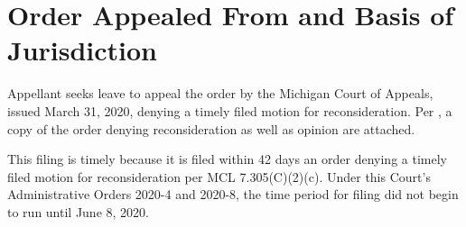 \documentclass[12pt,\documentclassflag]{michiganCourtOfAppealsBrief}
\begin{document}





\section{Order Appealed From and Basis of Jurisdiction}

Appellant seeks leave to appeal the order by the Michigan Court of Appeals, issued March 31, 2020,
denying a timely filed motion for reconsideration.
Per \cite{MCR 7.305(A)(2)}, a copy of the order denying reconsideration as well as opinion are attached.

This filing is timely because it is filed within 42 days an order denying a timely filed motion for reconsideration per MCL 7.305(C)(2)(c). Under this Court's Administrative Orders 2020-4 and 2020-8, the time period for filing did not begin to run until June 8, 2020.
\end{document}
